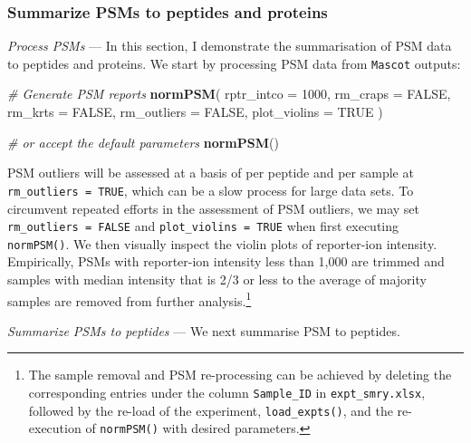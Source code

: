 \documentclass[]{article}
\newenvironment{Shaded}{\begin{snugshade}}{\end{snugshade}}
\newcommand{\CommentTok}[1]{\textcolor[rgb]{0.56,0.35,0.01}{\textit{#1}}}
\newcommand{\DataTypeTok}[1]{\textcolor[rgb]{0.13,0.29,0.53}{#1}}
\newcommand{\DecValTok}[1]{\textcolor[rgb]{0.00,0.00,0.81}{#1}}
\newcommand{\KeywordTok}[1]{\textcolor[rgb]{0.13,0.29,0.53}{\textbf{#1}}}
\newcommand{\NormalTok}[1]{#1}
\newcommand{\OtherTok}[1]{\textcolor[rgb]{0.56,0.35,0.01}{#1}}
\let\rmarkdownfootnote\footnote%
\def\footnote{\protect\rmarkdownfootnote}
\begin{document}
\hypertarget{summarize-psms-to-peptides-and-proteins}{%
\subsubsection{Summarize PSMs to peptides and
proteins}\label{summarize-psms-to-peptides-and-proteins}}

\vspace{1.5cm}

\emph{Process PSMs} --- In this section, I demonstrate the summarisation
of PSM data to peptides and proteins. We start by processing PSM data
from \texttt{Mascot} outputs:

\begin{Shaded}
\begin{Highlighting}[]
\CommentTok{# Generate PSM reports}
\KeywordTok{normPSM}\NormalTok{(}
 \DataTypeTok{rptr_intco =} \DecValTok{1000}\NormalTok{,}
 \DataTypeTok{rm_craps =} \OtherTok{FALSE}\NormalTok{,}
 \DataTypeTok{rm_krts =} \OtherTok{FALSE}\NormalTok{,}
 \DataTypeTok{rm_outliers =} \OtherTok{FALSE}\NormalTok{,}
 \DataTypeTok{plot_violins =} \OtherTok{TRUE}
\NormalTok{)}

\CommentTok{# or accept the default parameters }
\KeywordTok{normPSM}\NormalTok{()}
\end{Highlighting}
\end{Shaded}

PSM outliers will be assessed at a basis of per peptide and per sample
at \texttt{rm\_outliers\ =\ TRUE}, which can be a slow process for large
data sets. To circumvent repeated efforts in the assessment of PSM
outliers, we may set \texttt{rm\_outliers\ =\ FALSE} and
\texttt{plot\_violins\ =\ TRUE} when first executing \texttt{normPSM()}.
We then visually inspect the violin plots of reporter-ion intensity.
Empirically, PSMs with reporter-ion intensity less than 1,000 are
trimmed and samples with median intensity that is 2/3 or less to the
average of majority samples are removed from further analysis.\footnote{The
  sample removal and PSM re-processing can be achieved by deleting the
  corresponding entries under the column \texttt{Sample\_ID} in
  \texttt{expt\_smry.xlsx}, followed by the re-load of the experiment,
  \texttt{load\_expts()}, and the re-execution of \texttt{normPSM()}
  with desired parameters.}

\vspace{1.5cm}

\emph{Summarize PSMs to peptides} --- We next summarise PSM to peptides.
\end{document}
